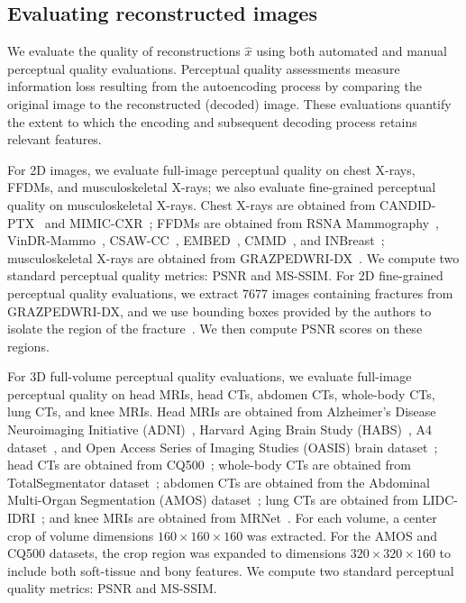 \subsection{Evaluating reconstructed images}
We evaluate the quality of reconstructions $\hat{x}$ using both automated and manual perceptual quality evaluations. Perceptual quality assessments measure information loss resulting from the autoencoding process by comparing the original image to the reconstructed (decoded) image. These evaluations quantify the extent to which the encoding and subsequent decoding process retains relevant features.

For 2D images, we evaluate full-image perceptual quality on chest X-rays, FFDMs, and musculoskeletal X-rays; we also evaluate fine-grained perceptual quality on musculoskeletal X-rays. Chest X-rays are obtained from CANDID-PTX~\cite{feng2021candid} and MIMIC-CXR~\cite{johnson2019mimic}; FFDMs are obtained from RSNA Mammography~\cite{rsnamammo}, VinDR-Mammo~\cite{nguyen2022vindrmammo}, CSAW-CC~\cite{sorkhei2021csaw}, EMBED~\cite{jeong2022emory}, CMMD~\cite{cai2023online}, and INBreast~\cite{moreira2012inbreast}; musculoskeletal X-rays are obtained from GRAZPEDWRI-DX~\cite{Nagy2022wristfrac}. We compute two standard perceptual quality metrics: PSNR and MS-SSIM. For 2D fine-grained perceptual quality evaluations, we extract 7677 images containing fractures from GRAZPEDWRI-DX, and we use bounding boxes provided by the authors to isolate the region of the fracture~\cite{Nagy2022wristfrac}. We then compute PSNR scores on these regions.

For 3D full-volume perceptual quality evaluations, we evaluate full-image perceptual quality on head MRIs, head CTs, abdomen CTs, whole-body CTs, lung CTs, and knee MRIs. Head MRIs are obtained from Alzheimer's Disease Neuroimaging Initiative (ADNI)~\cite{jack2008alzheimer}, Harvard Aging Brain Study (HABS)~\cite{dagley2017harvard}, A4 dataset~\cite{insel2020a4}, and Open Access Series of Imaging Studies (OASIS) brain dataset~\cite{lamontagne2019oasis}; head CTs are obtained from CQ500~\cite{chilamkurthy2018development}; whole-body CTs are obtained from TotalSegmentator dataset~\cite{wasserthal2023totalsegmentator}; abdomen CTs are obtained from the Abdominal Multi-Organ Segmentation (AMOS) dataset~\cite{ji2022amos}; lung CTs are obtained from LIDC-IDRI~\cite{armato2011lung}; and knee MRIs are obtained from MRNet~\cite{bien2018deep}. For each volume, a center crop of volume dimensions $160 \times 160 \times 160$ was extracted. For the AMOS and CQ500 datasets, the crop region was expanded to dimensions $320 \times 320 \times 160$ to include both soft-tissue and bony features. We compute two standard perceptual quality metrics: PSNR and MS-SSIM. 

